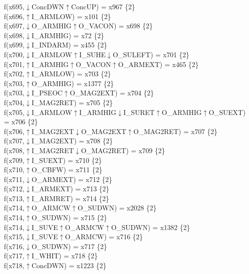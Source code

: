 f(x695,$\downarrow$ConcDWN$\uparrow$ConcUP) = x967 \{2\} \\  
f(x696,$\uparrow$I\_ARMLOW) = x101 \{2\} \\  
f(x697,$\downarrow$O\_ARMHIG$\uparrow$O\_VACON) = x698 \{2\} \\  
f(x698,$\downarrow$I\_ARMHIG) = x72 \{2\} \\  
f(x699,$\downarrow$I\_INDARM) = x455 \{2\} \\  
f(x700,$\downarrow$I\_ARMLOW$\uparrow$I\_SUHE$\downarrow$O\_SULEFT) = x701 \{2\} \\  
f(x701,$\uparrow$I\_ARMHIG$\uparrow$O\_VACON$\uparrow$O\_ARMEXT) = x465 \{2\} \\  
f(x702,$\uparrow$I\_ARMLOW) = x703 \{2\} \\  
f(x703,$\uparrow$O\_ARMHIG) = x1377 \{2\} \\  
f(x703,$\downarrow$I\_PSEOC$\uparrow$O\_MAG2EXT) = x704 \{2\} \\  
f(x704,$\downarrow$I\_MAG2RET) = x705 \{2\} \\  
f(x705,$\downarrow$I\_ARMLOW$\uparrow$I\_ARMHIG$\downarrow$I\_SURET$\uparrow$O\_ARMHIG$\uparrow$O\_SUEXT) = x706 \{2\} \\  
f(x706,$\uparrow$I\_MAG2EXT$\downarrow$O\_MAG2EXT$\uparrow$O\_MAG2RET) = x707 \{2\} \\  
f(x707,$\downarrow$I\_MAG2EXT) = x708 \{2\} \\  
f(x708,$\uparrow$I\_MAG2RET$\downarrow$O\_MAG2RET) = x709 \{2\} \\  
f(x709,$\uparrow$I\_SUEXT) = x710 \{2\} \\  
f(x710,$\uparrow$O\_CBFW) = x711 \{2\} \\  
f(x711,$\downarrow$O\_ARMEXT) = x712 \{2\} \\  
f(x712,$\downarrow$I\_ARMEXT) = x713 \{2\} \\  
f(x713,$\uparrow$I\_ARMRET) = x714 \{2\} \\  
f(x714,$\uparrow$O\_ARMCW$\uparrow$O\_SUDWN) = x2028 \{2\} \\  
f(x714,$\uparrow$O\_SUDWN) = x715 \{2\} \\  
f(x714,$\downarrow$I\_SUVE$\uparrow$O\_ARMCW$\uparrow$O\_SUDWN) = x1382 \{2\} \\  
f(x715,$\downarrow$I\_SUVE$\uparrow$O\_ARMCW) = x716 \{2\} \\  
f(x716,$\downarrow$O\_SUDWN) = x717 \{2\} \\  
f(x717,$\uparrow$I\_WHIT) = x718 \{2\} \\  
f(x718,$\uparrow$ConcDWN) = x1223 \{2\} \\  
